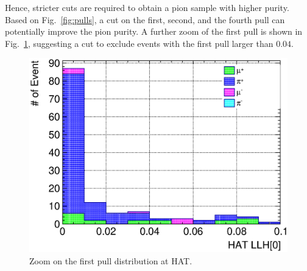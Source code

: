           Hence, stricter cuts are required to obtain a pion sample with higher purity.
          Based on Fig.~\ref{fig:pulls}, a cut on the first, second, and the fourth pull can potentially improve the pion purity.
          A further zoom of the first pull is shown in Fig.~\ref{fig:pull0-zoom}, suggesting a cut to exclude events with the first pull larger than $0.04$.
          \begin{figure}
               \centering
               \includegraphics[width=\textwidth]{figures/sel/sspi_TOP_hat_pid0_stack_al5_zoom.eps}
               \caption{Zoom on the first pull distribution at HAT.}
               \label{fig:pull0-zoom}
          \end{figure}

